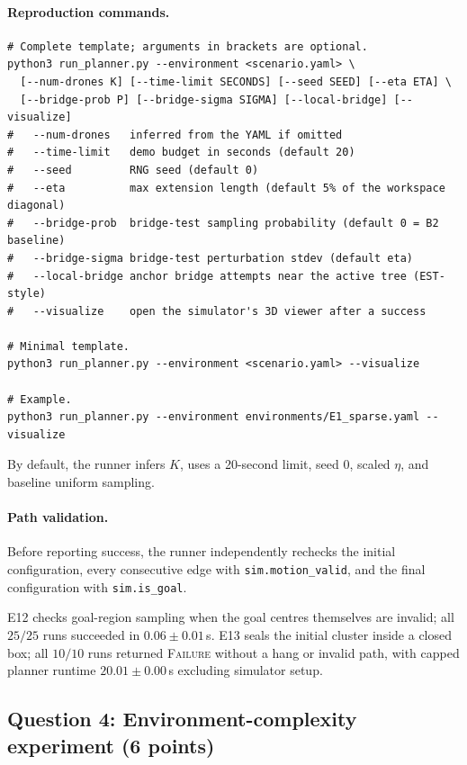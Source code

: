 \documentclass[11pt,a4paper]{article}
\begin{document}
\paragraph{Reproduction commands.}
\begin{lstlisting}[style=terminal]
# Complete template; arguments in brackets are optional.
python3 run_planner.py --environment <scenario.yaml> \
  [--num-drones K] [--time-limit SECONDS] [--seed SEED] [--eta ETA] \
  [--bridge-prob P] [--bridge-sigma SIGMA] [--local-bridge] [--visualize]
#   --num-drones   inferred from the YAML if omitted
#   --time-limit   demo budget in seconds (default 20)
#   --seed         RNG seed (default 0)
#   --eta          max extension length (default 5% of the workspace diagonal)
#   --bridge-prob  bridge-test sampling probability (default 0 = B2 baseline)
#   --bridge-sigma bridge-test perturbation stdev (default eta)
#   --local-bridge anchor bridge attempts near the active tree (EST-style)
#   --visualize    open the simulator's 3D viewer after a success

# Minimal template.
python3 run_planner.py --environment <scenario.yaml> --visualize

# Example.
python3 run_planner.py --environment environments/E1_sparse.yaml --visualize
\end{lstlisting}
By default, the runner infers $K$, uses a 20-second limit, seed 0, scaled
$\eta$, and baseline uniform sampling.

\paragraph{Path validation.}
Before reporting success, the runner independently rechecks the initial
configuration, every consecutive edge with \texttt{sim.motion\_valid}, and the
final configuration with \texttt{sim.is\_goal}.

E12 checks goal-region sampling when the goal centres themselves are invalid;
all $25/25$ runs succeeded in $0.06\pm0.01$\,s. E13 seals the initial cluster
inside a closed box; all $10/10$ runs returned \textsc{Failure} without a hang
or invalid path, with capped planner runtime $20.01\pm0.00$\,s excluding
simulator setup.

\subsection*{Question 4: Environment-complexity experiment (6 points)}
\end{document}

